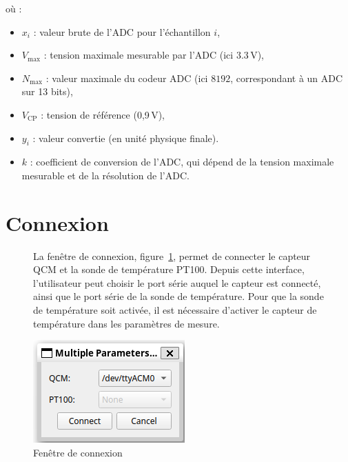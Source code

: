 où :
\begin{itemize}[label=\textbullet]
    \item $x_i$ : valeur brute de l'ADC pour l'échantillon $i$,
    \item $V_{\text{max}}$ : tension maximale mesurable par l'ADC (ici $3.3\,\mathrm{V}$),
    \item $N_{\text{max}}$ : valeur maximale du codeur ADC (ici $8192$, correspondant à un ADC sur 13 bits),
    \item $V_{\text{CP}}$ : tension de référence (0,9\,V),
    \item $y_i$ : valeur convertie (en unité physique finale).
    \item $k$ : coefficient de conversion de l'ADC, qui dépend de la tension maximale mesurable et de la résolution de l'ADC.   
\end{itemize}

\section{Connexion}

\begin{figure}[H]
    \begin{minipage}{0.64\textwidth}
        La fenêtre de connexion, figure~\ref{fig:connection window}, permet de connecter le capteur QCM et la sonde de température PT100.
        Depuis cette interface, l'utilisateur peut choisir le port série auquel le capteur est connecté, ainsi que le port série de la sonde de température.
        Pour que la sonde de température soit activée, il est nécessaire d'activer le capteur de température dans les paramètres de mesure.
    \end{minipage}\hfill
    \begin{minipage}{0.30\textwidth}
        \centering
        \includegraphics[width=\textwidth]{assets/figures/ConnectionDialogue.png}
        \caption{Fenêtre de connexion}
        \label{fig:connection window}
    \end{minipage}
\end{figure}

